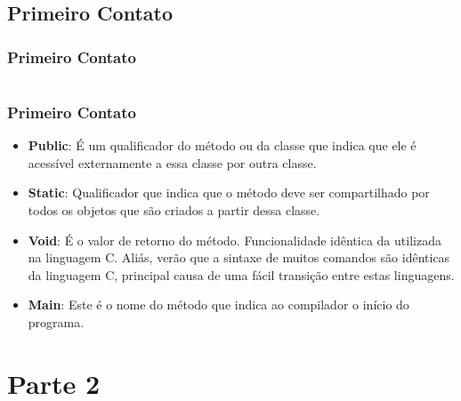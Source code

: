 \documentclass{beamer}
\begin{document}
\subsection{Primeiro Contato}

\begin{frame}
	\frametitle{Primeiro Contato}
	\begin{example}
		\inputminted{java}{codigos/PrimeiroContato01.java}
	\end{example}
\end{frame}

\begin{frame}
	\frametitle{Primeiro Contato}
	\begin{itemize}
		\item \textbf{Public}: É um qualificador do método ou da classe que indica que ele é acessível externamente a essa classe por outra classe. 
		\item \textbf{Static}: Qualificador que indica que o método deve ser compartilhado por todos os objetos que são criados a partir dessa classe.
		\item \textbf{Void}: É o valor de retorno do método. Funcionalidade idêntica da utilizada na linguagem C. Aliás, verão que a sintaxe de muitos comandos são idênticas da linguagem C, principal causa de uma fácil transição entre estas linguagens.
		\item \textbf{Main}: Este é o nome do método que indica ao compilador o início do programa.
	\end{itemize}
\end{frame}

\section{Parte 2}
\end{document}
